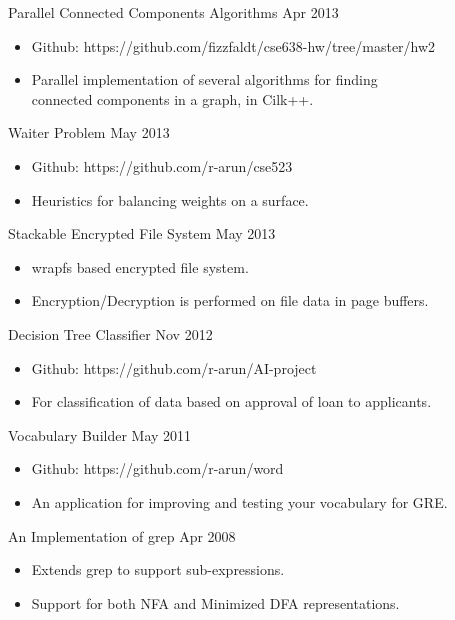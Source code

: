 \documentclass [margin] {res}
\begin{document}
\begin{resume}
		Parallel Connected Components Algorithms \hfill   Apr 2013
                \begin{itemize} \itemsep -2pt
				\item Github: https://github.com/fizzfaldt/cse638-hw/tree/master/hw2
                 \item Parallel implementation of several algorithms for finding\\
				 connected components in a graph, in Cilk++.
		 \end{itemize}

		Waiter Problem \hfill   May 2013
                \begin{itemize} \itemsep -2pt
		\item Github: https://github.com/r-arun/cse523
                 \item Heuristics for balancing weights on a surface.
		 \end{itemize}

		Stackable Encrypted File System \hfill   May 2013
                \begin{itemize} \itemsep -2pt
                 \item wrapfs based encrypted file system.
                 \item Encryption/Decryption is performed on file data in page buffers.
		 \end{itemize}

	   Decision Tree Classifier    \hfill         Nov 2012 
                \begin{itemize} \itemsep -2pt
		\item Github: https://github.com/r-arun/AI-project
              \item For classification of data based on approval of loan to applicants.
		 \end{itemize}

		Vocabulary Builder \hfill   May 2011
                \begin{itemize} \itemsep -2pt
		\item Github: https://github.com/r-arun/word
                 \item An application for improving and testing your vocabulary for GRE.
		 \end{itemize}

               An Implementation of grep    \hfill         Apr 2008 
                \begin{itemize} \itemsep -2pt
              \item Extends grep to support sub-expressions.            
                \item Support for both NFA and Minimized DFA representations.


\end{itemize}
\end{resume}
\end{document}
